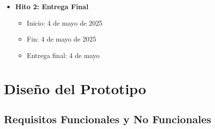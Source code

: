 \documentclass[journal,article,accept,pdftex,moreauthors]{Definitions/mdpi}
\begin{document}
\begin{itemize}
    \item \textbf{Hito 2: Entrega Final} %
    \begin{itemize}
        \item Inicio: 4 de mayo de 2025
        \item Fin: 4 de mayo de 2025
        \item Entrega final: 4 de mayo %
    \end{itemize}

\end{itemize}

\section{Diseño del Prototipo}

\subsection{Requisitos Funcionales y No Funcionales}
\end{document}
